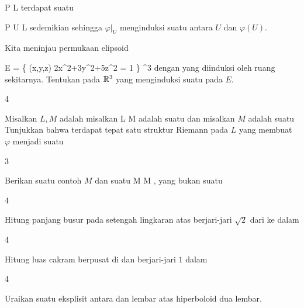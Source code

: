 \mavergleichskette
{\vergleichskette
{ P
}
{ \in }{ L
}
{  }{
}
{    }{
}
{   }{
}
}
{}{}{}
terdapat suatu

\mavergleichskette
{\vergleichskette
{ P
}
{ \in }{ U
}
{ \subseteq }{ L
}
{    }{
}
{   }{
}
}
{}{}{}
sedemikian sehingga $\varphi  \vert_U$ menginduksi suatu
antara $U$ dan $\varphi(U)$.


{}
{

Kita meninjau permukaan elipsoid

\mavergleichskettedisp
{\vergleichskette
{ E
}
{ =} { \left\{ (x,y,z)  \mid   2x^2+3y^2+5z^2 = 1        \right\}
}
{ \subset} { \R^3
}
{ } {
}
{ } {
}
}
{}{}{}
dengan
yang diinduksi oleh ruang sekitarnya. Tentukan
pada ${\mathbb R}^3$ yang menginduksi suatu
pada $E$.

}
{} {}

{4}
{

Misalkan $L,M$ adalah
misalkan
\maabbdisp {\varphi} { L } { M
} {}
adalah suatu
dan misalkan $M$ adalah suatu
Tunjukkan bahwa terdapat tepat satu struktur Riemann pada $L$ yang membuat $\varphi$ menjadi suatu

}
{} {}

{3}
{

Berikan suatu contoh
$M$ dan suatu
\maabbdisp {\varphi} { M } { M
} {,}
yang bukan suatu

}
{} {}

{4}
{

Hitung panjang busur pada setengah lingkaran atas berjari-jari $\sqrt{2}$ dari
 ke
 dalam

}
{} {}

{4}
{

Hitung luas cakram berpusat di
 dan berjari-jari $1$ dalam

}
{} {}

{4}
{

Uraikan suatu
eksplisit antara
dan lembar atas hiperboloid dua lembar.

}
{} {}
